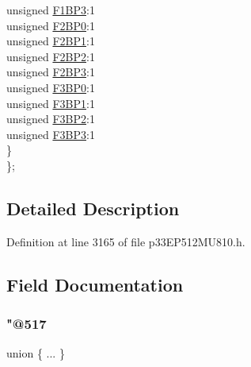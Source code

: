 \begin{DoxyCompactItemize}
\begin{tabbing}
\>\>unsigned \hyperlink{structtag_c1_b_u_f_p_n_t1_b_i_t_s_a203b28a82e4e91aed0387156204be668}{F1BP3}:1\\
\>\>unsigned \hyperlink{structtag_c1_b_u_f_p_n_t1_b_i_t_s_a07d8f96ad053958a0c4559faed8c13bd}{F2BP0}:1\\
\>\>unsigned \hyperlink{structtag_c1_b_u_f_p_n_t1_b_i_t_s_a580814a746cc941d3d99dcf34ac742cf}{F2BP1}:1\\
\>\>unsigned \hyperlink{structtag_c1_b_u_f_p_n_t1_b_i_t_s_a0f1374b0bc73a50a564ab4208e7595f2}{F2BP2}:1\\
\>\>unsigned \hyperlink{structtag_c1_b_u_f_p_n_t1_b_i_t_s_a2c3e484b98caab3ee173c6b944024c98}{F2BP3}:1\\
\>\>unsigned \hyperlink{structtag_c1_b_u_f_p_n_t1_b_i_t_s_a753d4513483516e79f634012dc16c54e}{F3BP0}:1\\
\>\>unsigned \hyperlink{structtag_c1_b_u_f_p_n_t1_b_i_t_s_af454b88a9aa90745634e8b8813d48c68}{F3BP1}:1\\
\>\>unsigned \hyperlink{structtag_c1_b_u_f_p_n_t1_b_i_t_s_a1e75d1073b686abfd1137ee647ae3147}{F3BP2}:1\\
\>\>unsigned \hyperlink{structtag_c1_b_u_f_p_n_t1_b_i_t_s_aee9920932ab1a451012ad6a2f4afaa19}{F3BP3}:1\\
\>\} \\
\}; \\

\end{tabbing}\end{DoxyCompactItemize}


\subsection{Detailed Description}


Definition at line 3165 of file p33\+E\+P512\+M\+U810.\+h.



\subsection{Field Documentation}
\mbox{\label{structtag_c1_b_u_f_p_n_t1_b_i_t_s_a784fae8a3f8bc5583231670b59821750}} 
\subsubsection{\texorpdfstring{"@517}{@517}}
{\footnotesize\ttfamily union \{ ... \} }

